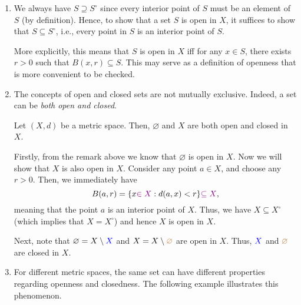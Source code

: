 \begin{enumerate}
\item \label{it:openness-equiv-def}
We always have \(S\supseteq S^{\circ}\) since every interior point of
\(S\) must be an element of \(S\) (by definition). Hence, to show that a set
\(S\) is open in \(X\), it suffices to show that \(S\subseteq S^{\circ}\),
i.e., every point in \(S\) is an interior point of \(S\).

More explicitly, this means that \(S\) is open in \(X\) iff for any \(x\in S\),
there exists \(r>0\) such that \(B(x,r)\subseteq S\). This may serve as a
definition of openness that is more convenient to be checked.

\item The concepts of open and closed sets are not mutually exclusive. Indeed,
a set can be \emph{both open and closed}.
\begin{proposition}
\label{prp:both-open-and-closed}
Let \((X,d)\) be a metric space. Then, \(\varnothing\) and \(X\) are both open
and closed in \(X\).
\end{proposition}
\begin{pf}
Firstly, from the remark above we know that \(\varnothing\) is open in \(X\).
Now we will show that \(X\) is also open in \(X\). Consider any point \(a\in
X\), and choose any \(r>0\). Then, we immediately have
\[
B(a,r)=\{x{\color{violet}\in X}:d(a,x)<r\}{\color{violet}\subseteq X},
\]
meaning that the point \(a\) is an interior point of \(X\). Thus, we have
\(X\subseteq X^{\circ}\) (which implies that \(X=X^{\circ}\)) and hence \(X\)
is open in \(X\).

Next, note that \(\varnothing=X\setminus {\color{blue}X}\) and
\(X=X\setminus{\color{brown}\varnothing}\) are open in \(X\). Thus, \({\color{blue}X}\) and
\({\color{brown}\varnothing}\) are closed in \(X\).
\end{pf}

\item For different metric spaces, the same set can have different properties
regarding openness and closedness. The following example illustrates this
phenomenon.


\end{enumerate}
